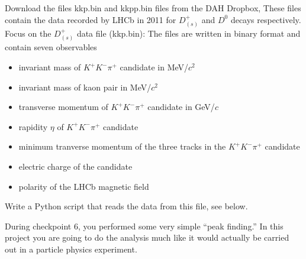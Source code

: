 \newpage
Download the files kkp.bin and kkpp.bin files from the DAH Dropbox,
These files contain the data recorded by LHCb in 2011 for $D_{(s)}^+$ and $D^0$ decays respectively.
Focus on the $D_{(s)}^+$ data file (kkp.bin):
The files are written in binary format and contain seven observables
\begin{itemize}
\item invariant mass of $K^{+}K^{-}\pi^{+}$ candidate in MeV/$c^2$
\item invariant mass of kaon pair in  MeV/$c^2$
\item transverse momentum of $K^{+}K^{-}\pi^{+}$ candidate in GeV/$c$
\item rapidity $\eta$ of $K^{+}K^{-}\pi^{+}$ candidate
\item minimum tranverse momentum of the three tracks in the $K^{+}K^{-}\pi^{+}$ candidate
\item electric charge of the candidate
\item polarity of the LHCb magnetic field
\end{itemize}

Write a Python script that reads the data from this file, see below.


During checkpoint 6, you performed some very simple ``peak finding.''
In this project you are going to do the analysis much like it would actually be carried out in a particle physics experiment.

